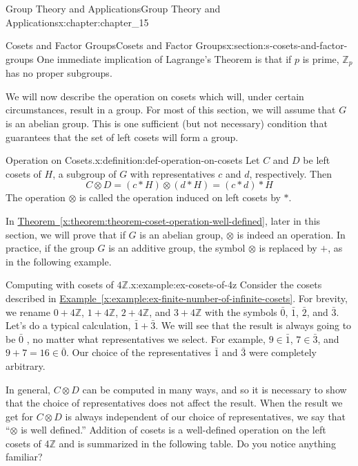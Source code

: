 \documentclass[oneside,10pt,]{book}
\newcommand{\xreffont}{\relax}
\numberwithin{equation}{section}
\begin{document}
\begin{chapterptx}{Group Theory and Applications}{}{Group Theory and Applications}{}{}{x:chapter:chapter_15}
\begin{sectionptx}{Cosets and Factor Groups}{}{Cosets and Factor Groups}{}{}{x:section:s-cosets-and-factor-groups}
One immediate implication of Lagrange's Theorem is that if \(p\) is prime, \(\mathbb{Z}_p\)  has no proper subgroups.%
\par
We will now describe the operation on cosets which will, under certain circumstances, result in a group. For most of this section, we will assume that \(G\) is an abelian group. This is one sufficient (but not necessary) condition that guarantees that the set of left cosets will form a group.%
\begin{definition}{Operation on Cosets.}{x:definition:def-operation-on-cosets}%
%
Let \(C\) and \(D\) be left cosets of \(H\), a subgroup of \(G\) with representatives \(c\) and \(d\), respectively. Then%
\begin{equation*}
C\otimes D = (c*H) \otimes (d*H) = (c*d)*H 
\end{equation*}
The operation \(\otimes\) is called the operation induced on left cosets by \(*\).%
\end{definition}
In \hyperref[x:theorem:theorem-coset-operation-well-defined]{Theorem~{\xreffont\ref{x:theorem:theorem-coset-operation-well-defined}}}, later in this section, we will prove that if \(G\) is an abelian group, \(\otimes\) is indeed an operation. In practice, if the group \(G\) is an additive group, the symbol \(\otimes\) is replaced by \(+\), as in the following example.%
\begin{example}{Computing with cosets of \(4\mathbb{Z}\).}{x:example:ex-cosets-of-4z}%
Consider the cosets described in \hyperref[x:example:ex-finite-number-of-infinite-cosets]{Example~{\xreffont\ref{x:example:ex-finite-number-of-infinite-cosets}}}.  For brevity, we rename \(0+4\mathbb{Z}\), \(1+4\mathbb{Z}\), \(2+4\mathbb{Z}\), and \(3+4\mathbb{Z}\) with the symbols \(\bar{0}\), \(\bar{1}\), \(\bar{2}\), and \(\bar{3}\).   Let's do a typical calculation, \(\bar{1}+\bar{3}\).  We will see that the result is always going to be \(\bar{0}\) , no matter what representatives we select.  For example, \(9 \in  \bar{1}\), \(7\in  \bar{3}\), and \(9+7=16 \in  \bar{0}\). Our choice of the representatives \(\bar{1}\) and \(\bar{3}\) were completely arbitrary.%
\end{example}
In general,  \(C \otimes  D\)  can be computed in many ways, and so it is necessary to show that the choice of representatives does not affect the result. When the result we get for \(C \otimes  D\) is always independent of our choice of representatives, we say that ``\(\otimes\) is well defined.''  Addition of cosets is a well-defined operation on the left cosets of 4\(\mathbb{Z}\) and is summarized in the following table. Do you notice anything familiar?%

\end{sectionptx}
\end{chapterptx}
\end{document}
